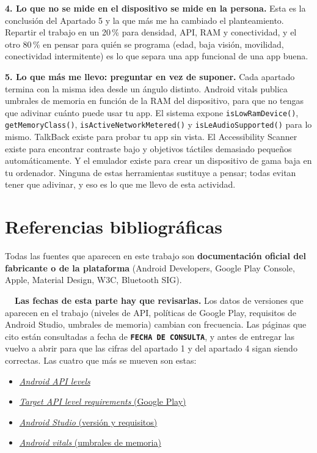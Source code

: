 \documentclass[11pt,a4paper]{article}
\newcommand{\code}[1]{\texttt{\color{ink}#1}}
\begin{document}
	\textbf{4. Lo que no se mide en el dispositivo se mide en la persona.} Esta es la conclusión del Apartado 5 y la que más me ha cambiado el planteamiento. Repartir el trabajo en un 20\,\% para densidad, API, RAM y conectividad, y el otro 80\,\% en pensar para quién se programa (edad, baja visión, movilidad, conectividad intermitente) es lo que separa una app funcional de una app buena.
	
	\textbf{5. Lo que más me llevo: preguntar en vez de suponer.} Cada apartado termina con la misma idea desde un ángulo distinto. Android vitals publica umbrales de memoria en función de la RAM del dispositivo, para que no tengas que adivinar cuánto puede usar tu app. El sistema expone \code{isLowRamDevice()}, \code{getMemoryClass()}, \code{isActiveNetworkMetered()} y \code{isLeAudioSupported()} para lo mismo. TalkBack existe para probar tu app sin vista. El Accessibility Scanner existe para encontrar contraste bajo y objetivos táctiles demasiado pequeños automáticamente. Y el emulador existe para crear un dispositivo de gama baja en tu ordenador. Ninguna de estas herramientas sustituye a pensar; todas evitan tener que adivinar, y eso es lo que me llevo de esta actividad.
	
	\newpage
	\section*{Referencias bibliográficas}
	
	Todas las fuentes que aparecen en este trabajo son \textbf{documentación oficial del fabricante o de la plataforma} (Android Developers, Google Play Console, Apple, Material Design, W3C, Bluetooth SIG).
	
	\begin{warnbox}
		\textbf{\color{accent!80!black}\faExclamationTriangle\ \ Las fechas de esta parte hay que revisarlas.}
		Los datos de versiones que aparecen en el trabajo (niveles de API, políticas de Google Play,
		requisitos de Android Studio, umbrales de memoria) cambian con frecuencia. Las páginas que cito
		están consultadas a fecha de \textbf{\texttt{FECHA DE CONSULTA}}, y antes de entregar las vuelvo
		a abrir para que las cifras del apartado 1 y del apartado 4 sigan siendo correctas. Las cuatro que
		más se mueven son estas:
		\begin{itemize}[leftmargin=*,itemsep=0.15em,topsep=0.2em]
			\item \href{https://developer.android.com/tools/releases/platforms}{\emph{Android API levels}}
			\item \href{https://support.google.com/googleplay/android-developer/answer/11926878}{\emph{Target API level requirements} (Google Play)}
			\item \href{https://developer.android.com/studio}{\emph{Android Studio} (versión y requisitos)}
			\item \href{https://developer.android.com/topic/performance/vitals}{\emph{Android vitals} (umbrales de memoria)}
		\end{itemize}
	\end{warnbox}
	
\end{document}
